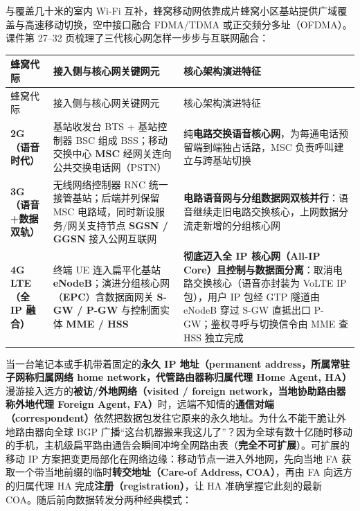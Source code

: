 
与覆盖几十米的室内 Wi-Fi 互补，蜂窝移动网依靠成片蜂窝小区基站提供广域覆盖与高速移动切换，空中接口融合 FDMA/TDMA 或正交频分多址（OFDMA）。课件第 27–32 页梳理了三代核心网怎样一步步与互联网融合：

\begingroup\small\setlength{\tabcolsep}{3pt}\renewcommand{\arraystretch}{1.22}
\begin{longtable}{@{}>{\raggedright\arraybackslash}p{}>{\raggedright\arraybackslash}p{}>{\raggedright\arraybackslash}p{}@{}}
\toprule
蜂窝代际 & 接入侧与核心网关键网元 & 核心架构演进特征 \\
\midrule\endfirsthead
蜂窝代际 & 接入侧与核心网关键网元 & 核心架构演进特征 \\
\midrule\endhead
\bottomrule\endfoot
\textbf{2G（语音时代）} & 基站收发台 BTS + 基站控制器 BSC 组成 BSS；移动交换中心 \textbf{MSC} 经网关连向公共交换电话网（PSTN） & 纯\textbf{电路交换语音核心网}，为每通电话预留端到端独占话路，MSC 负责呼叫建立与跨基站切换 \\
\textbf{3G（语音+数据双轨）} & 无线网络控制器 RNC 统一接管基站；后端并列保留 MSC 电路域，同时新设服务/网关支持节点 \textbf{SGSN / GGSN} 接入公网互联网 & \textbf{电路语音网与分组数据网双核并行}：语音继续走旧电路交换核心，上网数据分流走新增的分组核心网 \\
\textbf{4G LTE（全 IP 融合）} & 终端 UE 连入扁平化基站 \textbf{eNodeB}；演进分组核心网（\textbf{EPC}）含数据面网关 \textbf{S-GW / P-GW} 与控制面实体 \textbf{MME / HSS} & \textbf{彻底迈入全 IP 核心网（All-IP Core）且控制与数据面分离}：取消电路交换核心（语音亦封装为 VoLTE IP 包），用户 IP 包经 GTP 隧道由 eNodeB 穿过 S-GW 直抵出口 P-GW；鉴权寻呼与切换信令由 MME 查 HSS 独立完成 \\
\end{longtable}\endgroup



当一台笔记本或手机带着固定的\textbf{永久 IP 地址（permanent address，所属常驻子网称归属网络 home network，代管路由器称归属代理 Home Agent, HA）}漫游接入远方的\textbf{被访/外地网络（visited / foreign network，当地协助路由器称外地代理 Foreign Agent, FA）}时，远端不知情的\textbf{通信对端（correspondent）}依然把数据包发往它原来的永久地址。为什么不能干脆让外地路由器向全球 BGP 广播“这台机器搬来我这儿了”？因为全球有数十亿随时移动的手机，主机级扁平路由通告会瞬间冲垮全网路由表（\textbf{完全不可扩展}）。可扩展的移动 IP 方案把变更局部化在网络边缘：移动节点一进入外地网，先向当地 FA 获取一个带当地前缀的临时\textbf{转交地址（Care-of Address, COA）}，再由 FA 向远方的归属代理 HA 完成\textbf{注册（registration）}，让 HA 准确掌握它此刻的最新 COA。随后前向数据转发分两种经典模式：


